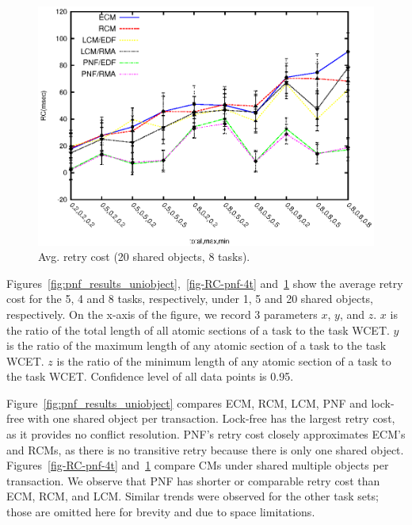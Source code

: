 \documentclass[twocolumn]{article}
\begin{document}
\begin{figure}[h]
\centering
\includegraphics[scale=0.5]{figures/Abr_dur_8t_90obj_100wr}
\caption{Avg. retry cost (20 shared objects, 8 tasks).}
\label{fig-RC-pnf-8t}
\end{figure}

Figures~\ref{fig:pnf_results_uniobject},~\ref{fig-RC-pnf-4t} and~\ref{fig-RC-pnf-8t} show the average retry cost for the 5, 4 and 8 tasks, respectively, under 1, 5 and 20 shared objects, respectively. On the x-axis of the figure, we record 3 parameters $x$, $y$, and $z$. $x$ is the ratio of the total length of all atomic sections of a task to the task WCET. $y$ is the ratio of the maximum length of any atomic section of a task to the task WCET. $z$ is the ratio of the minimum length of any atomic section of a task to the task WCET. Confidence level of all data points is 0.95. 

Figure~\ref{fig:pnf_results_uniobject} compares ECM, RCM, LCM, PNF and lock-free with one shared object per transaction. Lock-free has the largest retry cost, as it provides no conflict resolution. PNF's retry cost closely approximates ECM's and RCMs, as there is no transitive retry because there is only one shared object. Figures~\ref{fig-RC-pnf-4t} and~\ref{fig-RC-pnf-8t} compare CMs under shared multiple objects per transaction. We observe that PNF has shorter or comparable retry cost than ECM, RCM, and LCM. Similar trends were observed for the other task sets; those are omitted here for brevity and due to space limitations.

\end{document}
